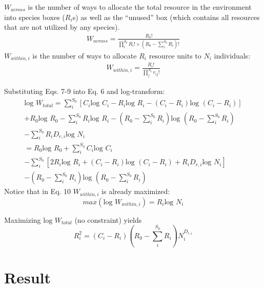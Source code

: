 \documentclass[12pt]{article}
\begin{document}
$W_{across}$ is the number of ways to allocate the total resource in the environment into species boxes ($R_i$s) as well as the ``unused'' box (which contains all resources that are not utilized by any species).
 \begin{equation}
 \begin{split}
W_{across} = \frac{R_0!}{\prod_i^{S_0}R_i! \times (R_0-\sum_i^{S_0}R_i)!}
\end{split}
\end{equation}
$W_{within,i}$ is the number of ways to allocate $R_i$ resource units to $N_i$ individuals:
 \begin{equation}
 \begin{split}
W_{within,i} = \frac{R_i!}{\prod_j^{N_i}r_{ij}! }
\end{split}
\end{equation}

 Substituting Eqs. 7-9 into Eq. 6 and log-transform:
  \begin{equation}
 \begin{split}
 \mbox{log }W_{total} = \sum^{S_0}_i [C_i \mbox{log } C_i - R_i \mbox{log } R_i - (C_i-R_i) \mbox{log } (C_i-R_i)] \\
 + R_0 \mbox{log } R_0 - \sum^{S_0}_i R_i\mbox{log } R_i - (R_0-\sum_i^{S_0}R_i) \mbox{log }(R_0-\sum_i^{S_0}R_i) \\
 - \sum^{S_0}_i R_i D_{r,i} \mbox{log } N_i\\
 = R_0 \mbox{log } R_0 + \sum^{S_0}_i C_i \mbox{log } C_i \\
 - \sum^{S_0}_i [2 R_i\mbox{log } R_i + (C_i-R_i) \mbox{log } (C_i-R_i)+ R_i D_{r,i} \mbox{log } N_i]\\
 - (R_0-\sum_i^{S_0}R_i) \mbox{log }(R_0-\sum_i^{S_0}R_i)
\end{split}
\end{equation}
Notice that in Eq. 10 $W_{within,i}$ is already maximized:
  \begin{equation}
max ( \mbox{log } W_{within,i}  )=  R_i \mbox{log } N_i
\end{equation}

Maximizing $ \mbox{log }W_{total}$ (no constraint) yields
  \begin{equation}
R_i^2 = (C_i-R_i)(R_0 -\sum_i^{S_0}R_i) N_i ^{D_{r,i}}
\end{equation}

\section{Result}
\end{document}
